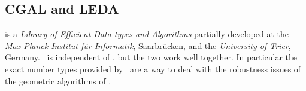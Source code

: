 \subsection{CGAL and LEDA}

is a {\em Library of Efficient Data types and Algorithms} partially developed 
at the {\em Max-Planck Institut f\"ur Informatik}, Saarbr\"ucken,
and the {\em University of Trier}, Germany.
\cgal\ is independent of \leda, but the two work well together.  In particular
the exact number types provided by \leda\ are a way to deal with the robustness
issues of the geometric algorithms of \cgal.
